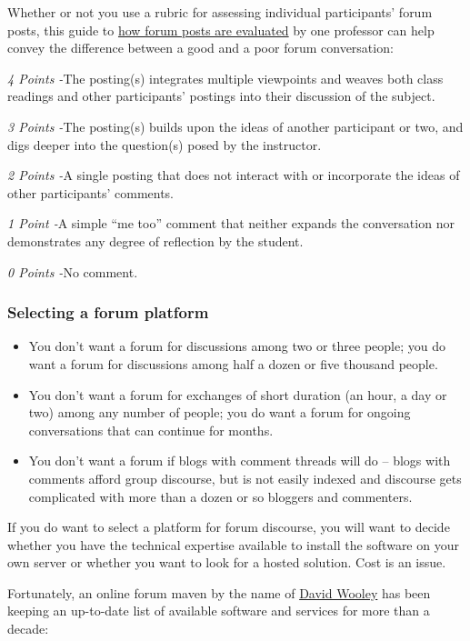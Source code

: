 Whether or not you use a rubric for assessing individual participants'
forum posts, this guide to
\href{http://www.wpi.edu/Academics/ATC/Collaboratory/Idea/boards.html}{how
forum posts are evaluated} by one professor can help convey the
difference between a good and a poor forum conversation:

\emph{4 Points -}The posting(s) integrates multiple viewpoints and
weaves both class readings and other participants' postings into their
discussion of the subject.

\emph{3 Points -}The posting(s) builds upon the ideas of another
participant or two, and digs deeper into the question(s) posed by the
instructor.

\emph{2 Points -}A single posting that does not interact with or
incorporate the ideas of other participants' comments.

\emph{1 Point -}A simple ``me too'' comment that neither expands the
conversation nor demonstrates any degree of reflection by the student.

\emph{0 Points -}No comment.

\subsubsection{Selecting a forum
platform}\label{selecting-a-forum-platform}

\begin{itemize}
\itemsep1pt\parskip0pt
\item
  You don't want a forum for discussions among two or three people; you
  do want a forum for discussions among half a dozen or five thousand
  people.
\item
  You don't want a forum for exchanges of short duration (an hour, a day
  or two) among any number of people; you do want a forum for ongoing
  conversations that can continue for months.
\item
  You don't want a forum if blogs with comment threads will do -- blogs
  with comments afford group discourse, but is not easily indexed and
  discourse gets complicated with more than a dozen or so bloggers and
  commenters.
\end{itemize}

If you do want to select a platform for forum discourse, you will want
to decide whether you have the technical expertise available to install
the software on your own server or whether you want to look for a hosted
solution. Cost is an issue.

Fortunately, an online forum maven by the name of
\href{http://thinkofit.com/whoweare.htm}{David Wooley} has been keeping
an up-to-date list of available software and services for more than a
decade:

